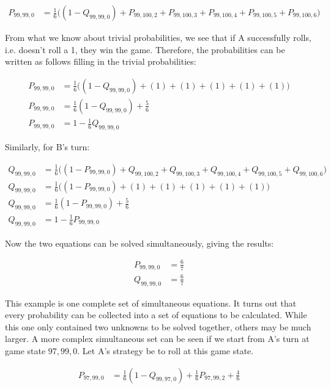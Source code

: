 \documentclass[a4paper,titlepage]{article}
\begin{document}
\begin{align*}
	P_{99,99,0} &= \frac{1}{6}\bigg((1 - Q_{99,99,0}) + P_{99,100,2} + P_{99,100,3} + P_{99,100,4} + P_{99,100,5} + P_{99,100,6}\bigg)
\end{align*}

From what we know about trivial probabilities, we see that if A successfully rolls, i.e. doesn't roll a 1, they win the game. Therefore, the probabilities can be written as follows filling in the trivial probabilities:

\begin{align*}
	P_{99,99,0} &= \frac{1}{6}\bigg((1 - Q_{99,99,0}) + (1) + (1) + (1) + (1) + (1)\bigg)\\
	P_{99,99,0} &= \frac{1}{6}(1 - Q_{99,99,0})+\frac{5}{6}\\
	P_{99,99,0} &= 1 - \frac{1}{6}Q_{99,99,0}
\end{align*}

Similarly, for B's turn:

\begin{align*}
	Q_{99,99,0} &= \frac{1}{6}\bigg((1 - P_{99,99,0}) + Q_{99,100,2} + Q_{99,100,3} + Q_{99,100,4} + Q_{99,100,5} + Q_{99,100,6}\bigg)\\
	Q_{99,99,0} &= \frac{1}{6}\bigg((1 - P_{99,99,0}) + (1) + (1) + (1) + (1) + (1)\bigg)\\
	Q_{99,99,0} &= \frac{1}{6}(1 - P_{99,99,0})+\frac{5}{6}\\
	Q_{99,99,0} &= 1 - \frac{1}{6}P_{99,99,0}
\end{align*}

Now the two equations can be solved simultaneously, giving the results:

\begin{align*}
	P_{99,99,0} &= \frac{6}{7}\\
	Q_{99,99,0} &= \frac{6}{7}
\end{align*}

This example is one complete set of simultaneous equations. It turns out that every probability can be collected into a set of equations to be calculated. While this one only contained two unknowns to be solved together, others may be much larger. A more complex simultaneous set can be seen if we start from A's turn at game state $97,99,0$. Let A's strategy be to roll at this game state.

\begin{align*}
	P_{97,99,0} &= \frac{1}{6}(1 - Q_{99,97,0})+\frac{1}{6}P_{97,99,2}+\frac{4}{6}\\
\end{align*}
\end{document}
